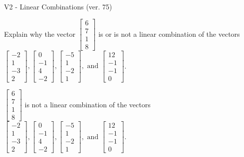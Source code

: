 \begin{exercise}
  \begin{exerciseTitle}V2 - Linear Combinations (ver. 75)\end{exerciseTitle}
  \begin{exerciseStatement}
    Explain why the vector \(\left[\begin{array}{c}
6 \\
7 \\
1 \\
8
\end{array}\right]\)  is or is not a linear 
	combination of the vectors \(\left[\begin{array}{c}
-2 \\
1 \\
-3 \\
2
\end{array}\right] , \left[\begin{array}{c}
0 \\
-1 \\
4 \\
-2
\end{array}\right] , \left[\begin{array}{c}
-5 \\
1 \\
-2 \\
1
\end{array}\right] , \text{ and } \left[\begin{array}{c}
12 \\
-1 \\
-1 \\
0
\end{array}\right]\).
	


  \end{exerciseStatement}
  \begin{exerciseAnswer}
   \(\left[\begin{array}{c}
6 \\
7 \\
1 \\
8
\end{array}\right]\) 
  	 is not  
	a linear combination of the vectors \(\left[\begin{array}{c}
-2 \\
1 \\
-3 \\
2
\end{array}\right] , \left[\begin{array}{c}
0 \\
-1 \\
4 \\
-2
\end{array}\right] , \left[\begin{array}{c}
-5 \\
1 \\
-2 \\
1
\end{array}\right] , \text{ and } \left[\begin{array}{c}
12 \\
-1 \\
-1 \\
0
\end{array}\right]\).


\end{exerciseAnswer}
\end{exercise}
